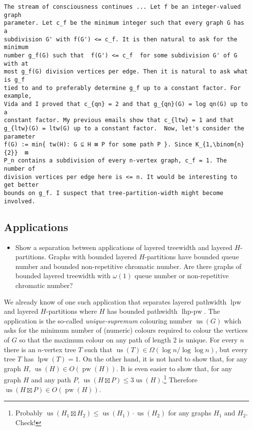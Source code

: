 \documentclass[kpfonts]{patmorin}
\DeclareMathOperator{\us}{us}
\DeclareMathOperator{\pw}{pw}
\DeclareMathOperator{\lpw}{lpw}
\DeclareMathOperator{\lhppw}{lhp-pw}
\begin{document}
\begin{verbatim}
The stream of consciousness continues ... Let f be an integer-valued graph
parameter. Let c_f be the minimum integer such that every graph G has a
subdivision G' with f(G') <= c_f. It is then natural to ask for the minimum
number g_f(G) such that  f(G') <= c_f  for some subdivision G' of G with at
most g_f(G) division vertices per edge. Then it is natural to ask what is g_f
tied to and to preferably determine g_f up to a constant factor. For example,
Vida and I proved that c_{qn} = 2 and that g_{qn}(G) = log qn(G) up to a
constant factor. My previous emails show that c_{ltw} = 1 and that
g_{ltw}(G) = ltw(G) up to a constant factor.  Now, let's consider the parameter
f(G) := min{ tw(H): G ⊆ H ⊠ P for some path P }. Since K_{1,\binom{n}{2}}  ⊠
P_n contains a subdivision of every n-vertex graph, c_f = 1. The number of
division vertices per edge here is <= n. It would be interesting to get better
bounds on g_f. I suspect that tree-partition-width might become involved.
\end{verbatim}

\subsection{Applications}


\begin{itemize}
    \item Show a separation between applications of layered treewidth and layered $H$-partitions.  Graphs with bounded layered $H$-partitions have bounded queue number and bounded non-repetitive chromatic number.  Are there graphs of bounded layered treewidth with $\omega(1)$ queue number or non-repetitive chromatic number?
\end{itemize}

We already know of one such application that separates layered pathwidth $\lpw$ and layered $H$-partitions where $H$ has bounded pathwidth $\lhppw$. The application is the so-called \emph{unique-supremum} colouring number $\us(G)$ which asks for the minimum number of (numeric) colours required to colour the vertices of $G$ so that the maximum colour on any path of length 2 is unique.  For every $n$ there is an $n$-vertex tree $T$ such that $\us(T)\in\Omega(\log n/\log\log n)$, but every tree $T$ has $\lpw(T)=1$.  On the other hand, it is not hard to show that, for any graph $H$, $\us(H)\in O(\pw(H))$.  It is even easier to show that, for any graph $H$ and any path $P$, $\us(H\boxtimes P)\le 3\us(H)$.\footnote{Probably $\us(H_1\boxtimes H_2)\le \us(H_1)\cdot\us(H_2)$ for any graphs $H_1$ and $H_2$. Check!}  Therefore $\us(H\boxtimes P)\in O(\pw(H))$.
\end{document}
